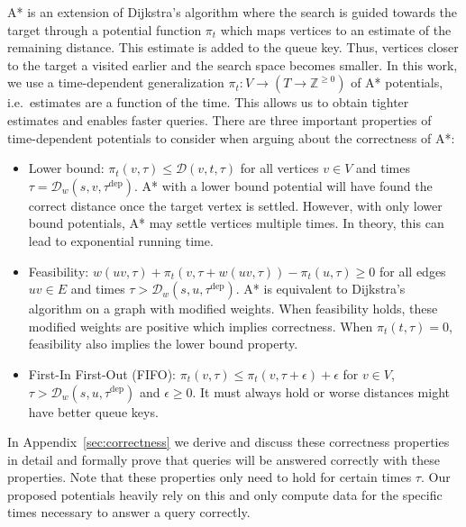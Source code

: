 \documentclass[a4paper,UKenglish,cleveref, autoref, thm-restate,anonymous]{lipics-v2021}
\newcommand*{\dist}{\mathcal{D}}
\newcommand*{\tdep}{\tau^{\operatorname{dep}}}
\begin{document}
A* is an extension of Dijkstra's algorithm where the search is guided towards the target through a potential function $\pi_t$ which maps vertices to an estimate of the remaining distance.
This estimate is added to the queue key.
Thus, vertices closer to the target a visited earlier and the search space becomes smaller.
%
In this work, we use a time-dependent generalization $\pi_t : V \to (T \to \mathbb{Z}^{\geq 0})$ of A* potentials, i.e.\ estimates are a function of the time.
This allows us to obtain tighter estimates and enables faster queries.
There are three important properties of time-dependent potentials to consider when arguing about the correctness of A*:
\begin{itemize}
  \item Lower bound: $\pi_t(v, \tau) \leq \dist(v,t,\tau)$ for all vertices $v \in V$ and times $\tau = \dist_w(s,v,\tdep)$.
  A* with a lower bound potential will have found the correct distance once the target vertex is settled.
  However, with only lower bound potentials, A* may settle vertices multiple times.
  In theory, this can lead to exponential running time.
  \item Feasibility: $w(uv, \tau) + \pi_t(v, \tau + w(uv, \tau)) - \pi_t(u, \tau) \geq 0$ for all edges $uv \in E$ and times $\tau > \dist_w(s,u,\tdep)$.
  A* is equivalent to Dijkstra's algorithm on a graph with modified weights.
  When feasibility holds, these modified weights are positive which implies correctness.
  When $\pi_t(t, \tau) = 0$, feasibility also implies the lower bound property.
  \item First-In First-Out (FIFO): $\pi_t(v, \tau) \leq \pi_t(v, \tau + \epsilon) + \epsilon$ for $v \in V$, $\tau > \dist_w(s,u,\tdep)$ and $\epsilon \geq 0$.
  It must always hold or worse distances might have better queue keys.
\end{itemize}
In Appendix~\ref{sec:correctness} we derive and discuss these correctness properties in detail and formally prove that queries will be answered correctly with these properties.
Note that these properties only need to hold for certain times $\tau$.
Our proposed potentials heavily rely on this and only compute data for the specific times necessary to answer a query correctly.

\end{document}
